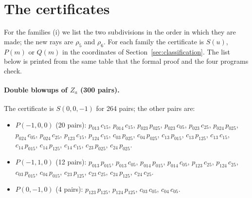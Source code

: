 \documentclass[12pt]{article}
\begin{document}
\section{The certificates}\label{app:table}

For the families (i) we list the two subdivisions in the order in which they are made; the new rays are $\rho_5$ and $\rho_6$. For each family the certificate is $S(u)$, $P(m)$ or $Q(m)$ in the coordinates of Section~\ref{sec:classification}. The list below is printed from the same table that the formal proof and the four programs check.

{\raggedright
\paragraph{Double blowups of $Z_a$ (300 pairs).} The certificate is $S(0,0,-1)$ for 264 pairs; the other pairs are:
\begin{itemize}
\item $P(-1,0,0)$ (20 pairs): $p_{013}\,c_{15}$, $p_{014}\,c_{15}$, $p_{023}\,p_{025}$, $p_{023}\,c_{05}$, $p_{023}\,c_{25}$, $p_{024}\,p_{025}$, $p_{024}\,c_{05}$, $p_{024}\,c_{25}$, $p_{123}\,c_{15}$, $p_{124}\,c_{15}$, $c_{03}\,p_{025}$, $c_{04}\,p_{025}$, $c_{13}\,p_{015}$, $c_{13}\,p_{125}$, $c_{13}\,c_{15}$, $c_{14}\,p_{015}$, $c_{14}\,p_{125}$, $c_{14}\,c_{15}$, $c_{23}\,p_{025}$, $c_{24}\,p_{025}$.
\item $P(-1,1,0)$ (12 pairs): $p_{013}\,p_{015}$, $p_{013}\,c_{05}$, $p_{014}\,p_{015}$, $p_{014}\,c_{05}$, $p_{123}\,c_{25}$, $p_{124}\,c_{25}$, $c_{03}\,p_{015}$, $c_{04}\,p_{015}$, $c_{23}\,p_{125}$, $c_{23}\,c_{25}$, $c_{24}\,p_{125}$, $c_{24}\,c_{25}$.
\item $P(0,-1,0)$ (4 pairs): $p_{123}\,p_{125}$, $p_{124}\,p_{125}$, $c_{03}\,c_{05}$, $c_{04}\,c_{05}$.
\end{itemize}
}
\end{document}
